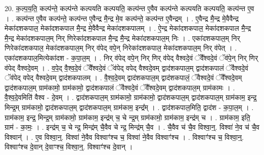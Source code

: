 \documentclass[17pt]{extarticle}
\begin{document}
20. क॒ल्प॒य॒ति॒ कल्प॑न्ते॒ कल्प॑न्ते कल्पयति कल्पयति॒ कल्प॑न्त ए॒वैव कल्प॑न्ते कल्पयति कल्पयति॒ कल्प॑न्त ए॒व । . कल्प॑न्त ए॒वैव कल्प॑न्ते॒ कल्प॑न्त ए॒वैन्द्र मै॒न्द्र मे॒व कल्प॑न्ते॒ कल्प॑न्त ए॒वैन्द्रम् । . ए॒वैन्द्र मै॒न्द्र मे॒वैवैन्द्र मेका॑दशकपाल॒ मेका॑दशकपाल मै॒न्द्र मे॒वैवैन्द्र मेका॑दशकपालम् । . ऐ॒न्द्र मेका॑दशकपाल॒ मेका॑दशकपाल मै॒न्द्र मै॒न्द्र मेका॑दशकपाल॒म् निर् णिरेका॑दशकपाल मै॒न्द्र मै॒न्द्र मेका॑दशकपाल॒म् निः । . एका॑दशकपाल॒म् निर् णिरेका॑दशकपाल॒ मेका॑दशकपाल॒म् निर् व॑पेद् वपे॒न् निरेका॑दशकपाल॒ मेका॑दशकपाल॒म् निर् व॑पेत् । . एका॑दशकपाल॒मित्येका॑दश - क॒पा॒ल॒म् । . निर् व॑पेद् वपे॒न् निर् णिर् व॑पेद् वैश्वदे॒वं ॅवै᳚श्वदे॒वं ॅव॑पे॒न् निर् णिर् व॑पेद् वैश्वदे॒वम् । . व॒पे॒द् वै॒श्व॒दे॒वं ॅवै᳚श्वदे॒वं ॅव॑पेद् वपेद् वैश्वदे॒वम् द्वाद॑शकपाल॒म् द्वाद॑शकपालं ॅवैश्वदे॒वं ॅव॑पेद् वपेद् वैश्वदे॒वम् द्वाद॑शकपालम् । . वै॒श्व॒दे॒वम् द्वाद॑शकपाल॒म् द्वाद॑शकपालं॒ ॅवैश्वदे॒वं ॅवै᳚श्वदे॒वम् द्वाद॑शकपाल॒म् ग्राम॑कामो॒ ग्राम॑कामो॒ द्वाद॑शकपालं ॅवैश्वदे॒वं ॅवै᳚श्वदे॒वम् द्वाद॑शकपाल॒म् ग्राम॑कामः । . वै॒श्व॒दे॒वमिति॑ वैश्व - दे॒वम् । . द्वाद॑शकपाल॒म् ग्राम॑कामो॒ ग्राम॑कामो॒ द्वाद॑शकपाल॒म् द्वाद॑शकपाल॒म् ग्राम॑काम॒ इन्द्र॒ मिन्द्र॒म् ग्राम॑कामो॒ द्वाद॑शकपाल॒म् द्वाद॑शकपाल॒म् ग्राम॑काम॒ इन्द्र᳚म् । . द्वाद॑शकपाल॒मिति॒ द्वाद॑श - क॒पा॒ल॒म् । . ग्राम॑काम॒ इन्द्र॒ मिन्द्र॒म् ग्राम॑कामो॒ ग्राम॑काम॒ इन्द्र॑म् च॒ चे न्द्र॒म् ग्राम॑कामो॒ ग्राम॑काम॒ इन्द्र॑म् च । . ग्राम॑काम॒ इति॒ ग्राम॑ - का॒मः॒ । . इन्द्र॑म् च॒ चे न्द्र॒ मिन्द्र॑म् चै॒वैव चे न्द्र॒ मिन्द्र॑म् चै॒व । . चै॒वैव च॑ चै॒व विश्वा॒न्॒. विश्वा॑ ने॒व च॑ चै॒व विश्वान्॑ । . ए॒व विश्वा॒न्॒. विश्वा॑ ने॒वैव विश्वाꣳ॑श्च च॒ विश्वा॑ ने॒वैव विश्वाꣳ॑श्च । . विश्वाꣳ॑श्च च॒ विश्वा॒न्॒. विश्वाꣳ॑श्च दे॒वान् दे॒वाꣳश्च॒ विश्वा॒न्॒. विश्वाꣳ॑श्च दे॒वान् । \newline
\end{document}
